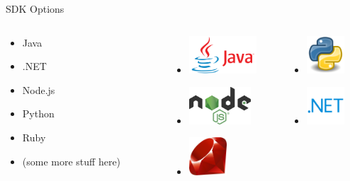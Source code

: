 \documentclass[presentation]{subfiles}
\begin{document}
\begin{frame}{SDK Options}
\begin{columns}[T]
\begin{column}{0.45\textwidth}
    \begin{itemize}
      \item Java
      \item .NET
      \item Node.js
      \item Python
      \item Ruby
      \item (some more stuff here)
    \end{itemize}
\end{column}
\begin{column}{0.55\textwidth}
\begin{columns}
\begin{column}{0.5\textwidth}
\begin{itemize}
  \item[] \includegraphics[height=40pt]{figures/java.png}
  \item[] \includegraphics[height=40pt]{figures/nodejs.png}
  \item[] \includegraphics[height=40pt]{figures/ruby.png}
\end{itemize}
\end{column}
\begin{column}{0.5\textwidth}
\begin{itemize}
  \item[] \includegraphics[height=40pt]{figures/python.png}
  \item[] \includegraphics[height=40pt]{figures/net.png}
\end{itemize}
\end{column}
\end{columns}
\end{column}
\end{columns}
\end{frame}
\end{document}

